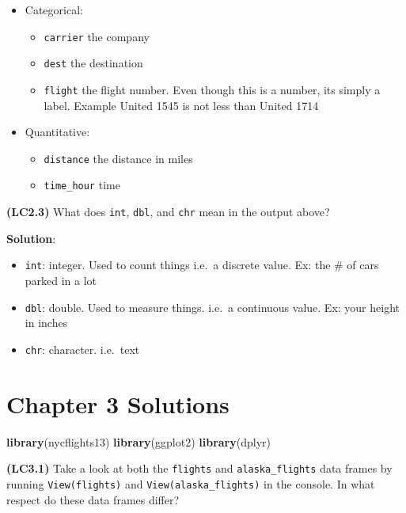 \documentclass[12pt,]{krantz}
\makeatletter
\newenvironment{Shaded}{\begin{snugshade}}{\end{snugshade}}
\newcommand{\KeywordTok}[1]{\textcolor[rgb]{0.27,0.27,0.27}{\textbf{#1}}}
\newcommand{\NormalTok}[1]{#1}
\providecommand{\tightlist}{%
  \setlength{\itemsep}{0pt}\setlength{\parskip}{0pt}}
\newenvironment{kframe}{%
\medskip{}
\setlength{\fboxsep}{.8em}
 \def\at@end@of@kframe{}%
 \ifinner\ifhmode%
  \def\at@end@of@kframe{\end{minipage}}%
  \begin{minipage}{\columnwidth}%
 \fi\fi%
 \def\FrameCommand##1{\hskip\@totalleftmargin \hskip-\fboxsep
 \colorbox{shadecolor}{##1}\hskip-\fboxsep
     \hskip-\linewidth \hskip-\@totalleftmargin \hskip\columnwidth}%
 \MakeFramed {\advance\hsize-\width
   \@totalleftmargin\z@ \linewidth\hsize
   \@setminipage}}%
 {\par\unskip\endMakeFramed%
 \at@end@of@kframe}
\renewenvironment{Shaded}{\begin{kframe}}{\end{kframe}}
\makeatother
\begin{document}
\begin{itemize}
\tightlist
\item
  Categorical:

  \begin{itemize}
  \tightlist
  \item
    \texttt{carrier} the company
  \item
    \texttt{dest} the destination
  \item
    \texttt{flight} the flight number. Even though this is a number, its
    simply a label. Example United 1545 is not less than United 1714
  \end{itemize}
\item
  Quantitative:

  \begin{itemize}
  \tightlist
  \item
    \texttt{distance} the distance in miles
  \item
    \texttt{time\_hour} time
  \end{itemize}
\end{itemize}

\textbf{(LC2.3)} What does \texttt{int}, \texttt{dbl}, and \texttt{chr}
mean in the output above?

\textbf{Solution}:

\begin{itemize}
\tightlist
\item
  \texttt{int}: integer. Used to count things i.e.~a discrete value. Ex:
  the \# of cars parked in a lot
\item
  \texttt{dbl}: double. Used to measure things. i.e.~a continuous value.
  Ex: your height in inches
\item
  \texttt{chr}: character. i.e.~text
\end{itemize}

\section{Chapter 3 Solutions}\label{chapter-3-solutions}

\begin{Shaded}
\begin{Highlighting}[]
\KeywordTok{library}\NormalTok{(nycflights13)}
\KeywordTok{library}\NormalTok{(ggplot2)}
\KeywordTok{library}\NormalTok{(dplyr)}
\end{Highlighting}
\end{Shaded}

\textbf{(LC3.1)} Take a look at both the \texttt{flights} and
\texttt{alaska\_flights} data frames by running \texttt{View(flights)}
and \texttt{View(alaska\_flights)} in the console. In what respect do
these data frames differ?
\end{document}
